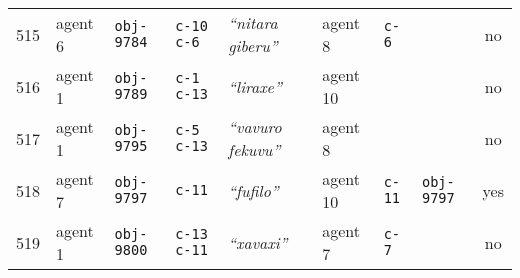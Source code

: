 {\begin{tabular}{@{}llllllllc@{}}
515 & agent 6 & \texttt{obj-9784} & \texttt{c-10 c-6} & \textit{``nitara giberu''} & agent 8 & \texttt{c-6} & \texttt{} & no \\
516 & agent 1 & \texttt{obj-9789} & \texttt{c-1 c-13} & \textit{``liraxe''} & agent 10 & \texttt{} & \texttt{} & no \\
517 & agent 1 & \texttt{obj-9795} & \texttt{c-5 c-13} & \textit{``vavuro fekuvu''} & agent 8 & \texttt{} & \texttt{} & no \\
518 & agent 7 & \texttt{obj-9797} & \texttt{c-11} & \textit{``fufilo''} & agent 10 & \texttt{c-11} & \texttt{obj-9797} & yes \\
519 & agent 1 & \texttt{obj-9800} & \texttt{c-13 c-11} & \textit{``xavaxi''} & agent 7 & \texttt{c-7} & \texttt{} & no \\
 \end{tabular}
}




